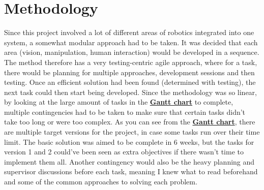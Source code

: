 

\section{Methodology}
Since this project involved a lot of different areas of robotics integrated into one system, a somewhat modular approach had to be taken. It was decided that each area (vision, manipulation, human interaction) would be developed in a sequence. The method therefore has a very testing-centric agile approach, where for a task, there would be planning for multiple approaches, development sessions and then testing. Once an efficient solution had been found (determined with testing), the next task could then start being developed. Since the methodology was so linear, by looking at the large amount of tasks in the \hyperref[sec:gantt]{\textbf{Gantt chart}} to complete, multiple contingencies had to be taken to make sure that certain tasks didn't take too long or were too complex.\newline\newline
As you can see from the \hyperref[sec:gantt]{\textbf{Gantt chart}}, there are multiple target versions for the project, in case some tasks run over their time limit. The basic solution was aimed to be complete in 6 weeks, but the tasks for version 1 and 2 could've been seen as extra objectives if there wasn't time to implement them all. Another contingency would also be the heavy planning and supervisor discussions before each task, meaning I knew what to read beforehand and some of the common approaches to solving each problem.
